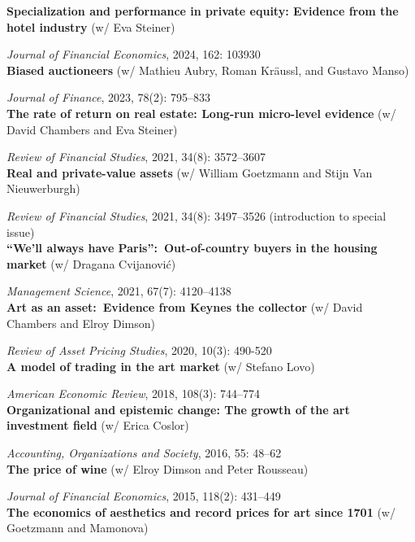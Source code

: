 \documentclass[a4paper]{article}
\begin{document}
\textbf{Specialization and performance in private equity: Evidence from the hotel industry} (w/ Eva Steiner) 

{\em Journal of Financial Economics}, 2024, 162: 103930 \\

\textbf{Biased auctioneers} (w/ Mathieu Aubry, Roman Kr\"aussl, and Gustavo Manso)

\textit{Journal of Finance}, 2023, 78(2): 795--833 \\

\textbf{The rate of return on real estate: Long-run micro-level evidence} (w/ David Chambers and Eva Steiner)

\textit{Review of Financial Studies}, 2021, 34(8): 3572--3607\\

\textbf{Real and private-value assets} (w/ William Goetzmann and Stijn Van Nieuwerburgh)

\textit{Review of Financial Studies}, 2021, 34(8): 3497--3526 (introduction to special issue) \\

\textbf{``We'll always have Paris'':\ Out-of-country buyers in the housing market} (w/ Dragana Cvijanovi{\'c})

\textit{Management Science}, 2021, 67(7): 4120--4138\\

\textbf{Art as an asset:\ Evidence from Keynes the collector} (w/ David Chambers and Elroy Dimson)

\textit{Review of Asset Pricing Studies}, 2020, 10(3): 490-520\\

\textbf{A model of trading in the art market} (w/ Stefano Lovo)

\textit{American Economic Review}, 2018, 108(3): 744--774\\

\textbf{Organizational and epistemic change: The growth of the art investment field} (w/ Erica Coslor)

\textit{Accounting, Organizations and Society}, 2016, 55: 48--62\\

\textbf{The price of wine} (w/ Elroy Dimson and Peter Rousseau)

\textit{Journal of Financial Economics}, 2015, 118(2): 431--449\\

\textbf{The economics of aesthetics and record prices for art since 1701} (w/ Goetzmann and Mamonova)
\end{document}
